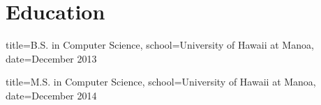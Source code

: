 \documentclass{resume}
\begin{document}

\makeheader

\section{Education}
\begin{degree}{title=B.S. in Computer Science,
               school=University of Hawaii at Manoa,
               date=December 2013}

\end{degree}

\begin{degree}{title=M.S. in Computer Science,
               school=University of Hawaii at Manoa,
               date=December 2014}

\end{degree}
\end{document}
